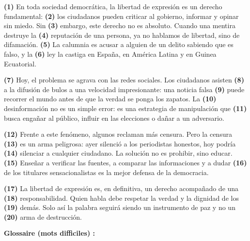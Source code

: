 \documentclass[11pt]{article}
\begin{document}
\begin{textebox}
\textbf{(1)} En toda sociedad democrática, la libertad de expresión es un derecho fundamental: \textbf{(2)} los ciudadanos pueden criticar al gobierno, informar y opinar sin miedo. Sin \textbf{(3)} embargo, este derecho no es absoluto. Cuando una mentira destruye la \textbf{(4)} reputación de una persona, ya no hablamos de libertad, sino de difamación. \textbf{(5)} La calumnia es acusar a alguien de un delito sabiendo que es falso, y la \textbf{(6)} ley la castiga en España, en América Latina y en Guinea Ecuatorial.

\textbf{(7)} Hoy, el problema se agrava con las redes sociales. Los ciudadanos asisten \textbf{(8)} a la difusión de bulos a una velocidad impresionante: una noticia falsa \textbf{(9)} puede recorrer el mundo antes de que la verdad se ponga los zapatos. La \textbf{(10)} desinformación no es un simple error: es una estrategia de manipulación que \textbf{(11)} busca engañar al público, influir en las elecciones o dañar a un adversario.

\textbf{(12)} Frente a este fenómeno, algunos reclaman más censura. Pero la censura \textbf{(13)} es un arma peligrosa: ayer silenció a los periodistas honestos, hoy podría \textbf{(14)} silenciar a cualquier ciudadano. La solución no es prohibir, sino educar. \textbf{(15)} Enseñar a verificar las fuentes, a comparar las informaciones y a dudar \textbf{(16)} de los titulares sensacionalistas es la mejor defensa de la democracia.

\textbf{(17)} La libertad de expresión es, en definitiva, un derecho acompañado de una \textbf{(18)} responsabilidad. Quien habla debe respetar la verdad y la dignidad de los \textbf{(19)} demás. Solo así la palabra seguirá siendo un instrumento de paz y no un \textbf{(20)} arma de destrucción.
\end{textebox}

\textbf{Glossaire (mots difficiles) :}
\end{document}
